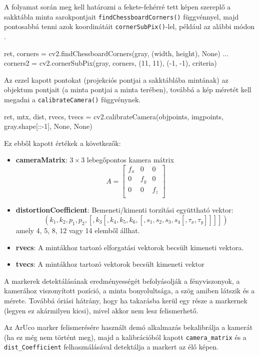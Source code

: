 A folyamat során meg kell határozni a fekete-fehérré tett képen szereplő a sakktábla minta sarokpontjait
\texttt{findChessboardCorners()} függvénnyel, majd pontosabbá tenni azok koordinátáit
\texttt{cornerSubPix()}-lel, például az alábbi módon \cite{opencvcalib}.
\begin{python}
ret, corners = cv2.findChessboardCorners(gray, (width, height), None)
...
corners2 = cv2.cornerSubPix(gray, corners, (11, 11), (-1, -1), criteria)
\end{python}
Az ezzel kapott pontokat (projekciós pontjai a sakktáblába mintának) az objektum pontjait (a minta pontjai a minta terében), továbbá a kép méretét kell megadni a \texttt{calibrateCamera()} függvénynek.
\begin{python}
ret, mtx, dist, rvecs, tvecs = cv2.calibrateCamera(objpoints,
  imgpoints, gray.shape[::-1], None, None)
\end{python}
Ez ebből kapott értékek a következők:
\begin{itemize}
\item {\bf cameraMatrix}: $3 \times 3$ lebegőpontos kamera mátrix
\[
A =
\begin{bmatrix}
	f_x & 0 & 0 \\
	0 & f_y & 0 \\
	0 & 0 & f_z \\
\end{bmatrix}
\]

\item {\bf distortionCoefficient}: Bemeneti/kimenti torzítási együttható vektor:
\[
(k_1, k_2, p_1, p_2, [, k_3 [, k_4, k_5, k_6, [, s_1, s_2, s_3, s_4 [, \tau_x, \tau_y]]]])
\]
amely 4, 5, 8, 12 vagy 14 elemből állhat.

\item {\bf rvecs}: A mintákhoz tartozó elforgatási vektorok becsült kimeneti vektora.

\item {\bf tvecs}: A mintákhoz tartozó vektorok becsült kimeneti vektor
\end{itemize}


A markerek detektálásának eredményességét befolyásolják a fényviszonyok, a kamerához viszonyított pozíció, a minta bonyolultsága, a szög amiben látszik és a mérete. Továbbá óriási hátrány, hogy ha takarásba kerül egy része a markernek (legyen ez akármilyen kicsi), mivel akkor nem lesz felismerhető.

Az ArUco marker felismerésére használt demó alkalmazás bekalibrálja a kamerát (ha ez még nem történt meg), majd a kalibrációból kapott \texttt{camera\_matrix} és a \texttt{dist\_Coefficient} felhasználásával detektálja a markert az élő képen.

